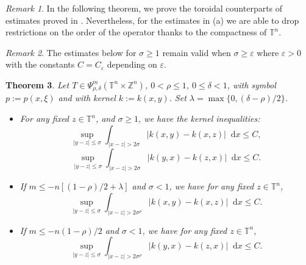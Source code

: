 \documentclass[12pt, reqno]{amsart}
\newtheorem{theorem}{Theorem}[section]
\theoremstyle{definition}
\theoremstyle{remark}
\newtheorem{remark}[theorem]{Remark}
\numberwithin{equation}{section}
\newcommand*\diff{\mathop{}\!\mathrm{d}}
\begin{document}
\begin{remark}
    In the following theorem, we prove the toroidal counterparts of estimates proved in \cite[Theorem~2.1]{alvarez-hounie}. Nevertheless, for the estimates in (a) we are able to drop restrictions on the order of the operator thanks to the compactness of $\mathbb{T}^n$.
\end{remark}
\begin{remark}
    The estimates below for $\sigma \geq 1$ remain valid when $\sigma \geq \varepsilon$ where $\varepsilon>0$ with the constants $C=C_\varepsilon$ depending on $\varepsilon$.
\end{remark}
\begin{theorem}
    Let $T \in \Psi^m_{\rho, \delta}(\mathbb{T}^n \times \mathbb{Z}^n) $, $0 < \rho \leq 1$, $0 \leq \delta < 1$, with symbol $p:=p(x, \xi)$ and with kernel $k:=k(x, y)$. Set $\lambda = \max\{ 0, (\delta - \rho)/2 \}$.
    \begin{itemize}
        \item[(a)] For any fixed $z \in \mathbb{T}^n$, and $\sigma \geq 1$, we have the kernel inequalities:
        \begin{equation}
            \sup_{|y-z| \leq \sigma} \int_{|x-z| > 2\sigma}|k(x, y) - k(x, z)|\diff x \leq C,
        \end{equation}
        \begin{equation}
            \sup_{|y-z| \leq \sigma} \int_{|x-z| > 2\sigma}|k(y, x) - k(z, x)|\diff x \leq C.
        \end{equation}
        \item[(b)] If $m \leq -n [(1-\rho)/2 + \lambda] $ and $\sigma < 1$, we have for any fixed $z \in \mathbb{T}^n$, 
        \begin{equation}
            \sup_{|y-z| \leq \sigma} \int_{|x-z| > 2\sigma^\rho}|k(x, y) - k(x, z)|\diff x \leq C.
        \end{equation}
        \item[(c)] If $m \leq -n (1 - \rho) / 2$ and $\sigma < 1$, we have  for any fixed $z \in \mathbb{T}^n$,
        \begin{equation}
            \sup_{|y-z| \leq \sigma} \int_{|x-z| > 2\sigma^\rho}|k(y, x) - k(z, x)|\diff x \leq C.
        \end{equation} 
    \end{itemize}
    \label{theo:sigma-kernel-estimate}
\end{theorem}
\end{document}
